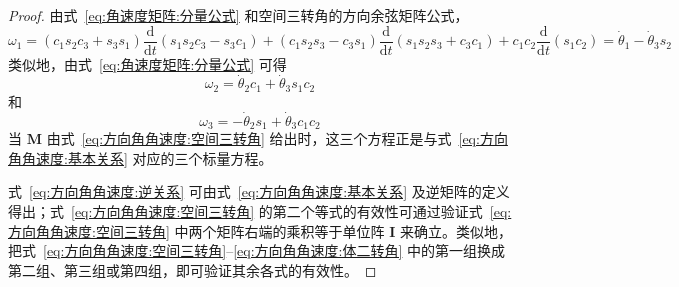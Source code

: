 \begin{proof}
    由式~\eqref{eq:角速度矩阵:分量公式} 和空间三转角的方向余弦矩阵公式，
\begin{equation}
    \omega_1 = (c_1s_2c_3+s_3s_1)\frac{\mathrm{d}}{\mathrm{d}t}(s_1s_2c_3-s_3c_1)
    + (c_1s_2s_3-c_3s_1)\frac{\mathrm{d}}{\mathrm{d}t}(s_1s_2s_3+c_3c_1)
    + c_1c_2\frac{\mathrm{d}}{\mathrm{d}t}(s_1c_2) = \dot{\theta}_1-\dot{\theta}_3s_2
\end{equation}
类似地，由式~\eqref{eq:角速度矩阵:分量公式} 可得
\begin{equation}
    \omega_2 = \dot{\theta}_2c_1+\dot{\theta}_3s_1c_2
\end{equation}
和
\begin{equation}
    \omega_3 = -\dot{\theta}_2s_1+\dot{\theta}_3c_1c_2
\end{equation}
当 $\bm{M}$ 由式~\eqref{eq:方向角角速度:空间三转角} 给出时，这三个方程正是与式~\eqref{eq:方向角角速度:基本关系} 对应的三个标量方程。

式~\eqref{eq:方向角角速度:逆关系} 可由式~\eqref{eq:方向角角速度:基本关系} 及逆矩阵的定义得出；式~\eqref{eq:方向角角速度:空间三转角} 的第二个等式的有效性可通过验证式~\eqref{eq:方向角角速度:空间三转角} 中两个矩阵右端的乘积等于单位阵 $\bm{I}$ 来确立。类似地，把式~\eqref{eq:方向角角速度:空间三转角}--\eqref{eq:方向角角速度:体二转角} 中的第一组换成第二组、第三组或第四组，即可验证其余各式的有效性。

\end{proof}

